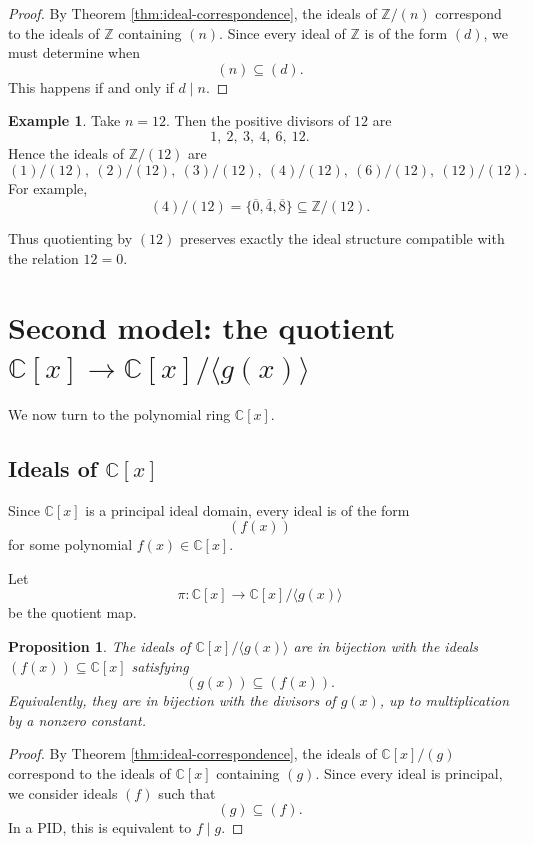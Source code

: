 \documentclass[11pt]{article}
\newtheorem{proposition}[theorem]{Proposition}
\theoremstyle{definition}
\newtheorem{example}[theorem]{Example}
\newcommand{\Z}{\mathbb{Z}}
\newcommand{\C}{\mathbb{C}}
\newcommand{\ideal}[1]{\langle #1\rangle}
\newcommand{\ol}[1]{\overline{#1}}
\begin{document}
	\begin{proof}
		By Theorem \ref{thm:ideal-correspondence}, the ideals of \(\Z/(n)\) correspond to the ideals of \(\Z\) containing \((n)\). Since every ideal of \(\Z\) is of the form \((d)\), we must determine when
		\[
		(n)\subseteq (d).
		\]
		This happens if and only if \(d\mid n\).
	\end{proof}
	
	\begin{example}
		Take \(n=12\). Then the positive divisors of \(12\) are
		\[
		1,\ 2,\ 3,\ 4,\ 6,\ 12.
		\]
		Hence the ideals of \(\Z/(12)\) are
		\[
		(1)/(12),\ (2)/(12),\ (3)/(12),\ (4)/(12),\ (6)/(12),\ (12)/(12).
		\]
		For example,
		\[
		(4)/(12)=\{\ol{0},\ol{4},\ol{8}\}\subseteq \Z/(12).
		\]
	\end{example}
	
	Thus quotienting by \((12)\) preserves exactly the ideal structure compatible with the relation \(12=0\).
	
	\section{Second model: the quotient \(\C[x]\to \C[x]/\ideal{g(x)}\)}
	
	We now turn to the polynomial ring \(\C[x]\).
	
	\subsection{Ideals of \(\C[x]\)}
	
	Since \(\C[x]\) is a principal ideal domain, every ideal is of the form
	\[
	(f(x))
	\]
	for some polynomial \(f(x)\in \C[x]\).
	
	Let
	\[
	\pi:\C[x]\to \C[x]/\ideal{g(x)}
	\]
	be the quotient map.
	
	\begin{proposition}\label{prop:Cx-quotient}
		The ideals of \(\C[x]/\ideal{g(x)}\) are in bijection with the ideals \((f(x))\subseteq \C[x]\) satisfying
		\[
		(g(x))\subseteq (f(x)).
		\]
		Equivalently, they are in bijection with the divisors of \(g(x)\), up to multiplication by a nonzero constant.
	\end{proposition}
	
	\begin{proof}
		By Theorem \ref{thm:ideal-correspondence}, the ideals of \(\C[x]/(g)\) correspond to the ideals of \(\C[x]\) containing \((g)\). Since every ideal is principal, we consider ideals \((f)\) such that
		\[
		(g)\subseteq (f).
		\]
		In a PID, this is equivalent to \(f\mid g\).
	\end{proof}
	
\end{document}
